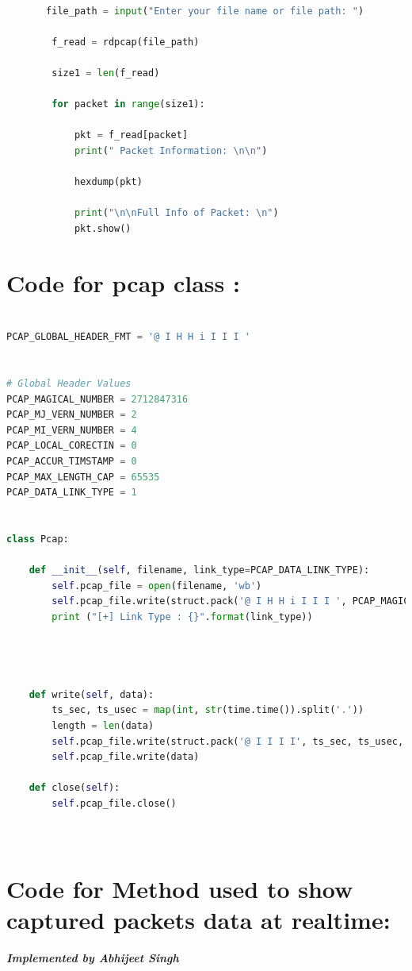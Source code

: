 \documentclass[12pt, a4paper]{report}
\begin{document}
\begin{lstlisting}[language=Python, style=chstyle]

       file_path = input("Enter your file name or file path: ")

        f_read = rdpcap(file_path)

        size1 = len(f_read)

        for packet in range(size1):

            pkt = f_read[packet]
            print(" Packet Information: \n\n")
            
            hexdump(pkt)

            print("\n\nFull Info of Packet: \n")
            pkt.show()


\end{lstlisting}

\section{Code for pcap class :}


\begin{lstlisting}[language=Python, style=chstyle]

PCAP_GLOBAL_HEADER_FMT = '@ I H H i I I I '


# Global Header Values
PCAP_MAGICAL_NUMBER = 2712847316
PCAP_MJ_VERN_NUMBER = 2
PCAP_MI_VERN_NUMBER = 4
PCAP_LOCAL_CORECTIN = 0
PCAP_ACCUR_TIMSTAMP = 0
PCAP_MAX_LENGTH_CAP = 65535
PCAP_DATA_LINK_TYPE = 1


class Pcap:

    def __init__(self, filename, link_type=PCAP_DATA_LINK_TYPE):
        self.pcap_file = open(filename, 'wb') 
        self.pcap_file.write(struct.pack('@ I H H i I I I ', PCAP_MAGICAL_NUMBER, PCAP_MJ_VERN_NUMBER, PCAP_MI_VERN_NUMBER, PCAP_LOCAL_CORECTIN, PCAP_ACCUR_TIMSTAMP, PCAP_MAX_LENGTH_CAP, link_type))
        print ("[+] Link Type : {}".format(link_type))




    def write(self, data):
        ts_sec, ts_usec = map(int, str(time.time()).split('.'))
        length = len(data)
        self.pcap_file.write(struct.pack('@ I I I I', ts_sec, ts_usec, length, length))
        self.pcap_file.write(data)

    def close(self):
        self.pcap_file.close()




\end{lstlisting}


\section{Code for Method used to show captured packets data at realtime:}
\emph{\large \textbf{Implemented by Abhijeet Singh\\}}
\end{document}
